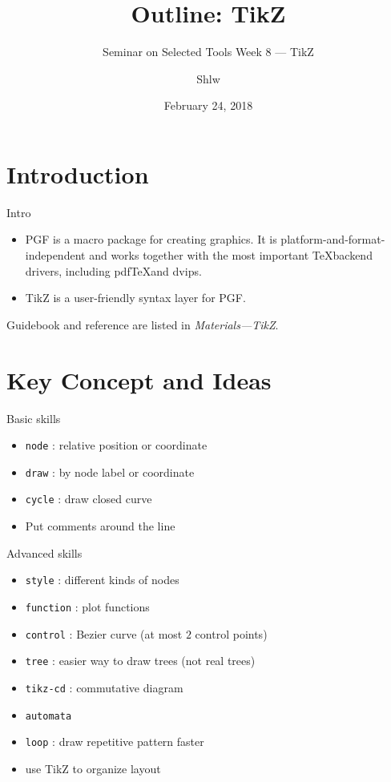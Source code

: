 \documentclass[english, nochinese]{../TeXTemplate/pkuslide}
\title{Outline: TikZ}
\subtitle{Seminar on Selected Tools Week 8 --- TikZ}
\author{Shlw}
\date{February 24, 2018}
\begin{document}
\begin{frame}
\titlepage
\end{frame}

\begin{frame}
\tableofcontents[subsectionstyle=show]
\end{frame}

\section{Introduction}

\begin{frame}
\sectionpage
\end{frame}

\begin{frame}{Intro}
\begin{itemize}
\item PGF is a macro package for creating graphics.
    It is platform-and-format-independent and
    works together with the most important \TeX backend drivers,
    including pdf\TeX and dvips.
\item TikZ is a user-friendly syntax layer for PGF.
\end{itemize}
Guidebook and reference are listed in \textit{Materials---TikZ}.
\end{frame}

\section{Key Concept and Ideas}

\begin{frame}
\sectionpage
\end{frame}

\begin{frame}[fragile]{Basic skills}
\begin{itemize}
\item \verb"node" : relative position or coordinate
\item \verb"draw" : by node label or coordinate
\item \verb"cycle" : draw closed curve
\item Put comments around the line
\end{itemize}
\end{frame}

\begin{frame}[fragile]{Advanced skills}
\begin{itemize}
\item \verb"style" : different kinds of nodes
\item \verb"function" : plot functions
\item \verb"control" : Bezier curve (at most $2$ control points)
\item \verb"tree" : easier way to draw trees (not real trees)
\item \verb"tikz-cd" : commutative diagram
\item \verb"automata"
\item \verb"loop" : draw repetitive pattern faster
\item use TikZ to organize layout
\end{itemize}
\end{frame}
\end{document}
